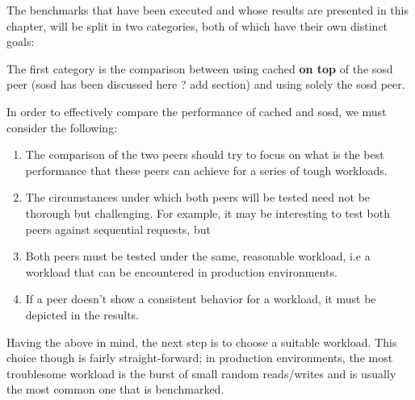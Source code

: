 The benchmarks that have been executed and whose results are presented in this 
chapter, will be split in two categories, both of which have their own distinct 
goals:

The first category is the comparison between using cached \textbf{on top} of 
the sosd peer (sosd has been discussed here ? \fixme add section) and using 
solely the sosd peer.

\begin{comment}
The category's goal is to "defend" one of the core thesis arguments, that 
tiering is a key element that will improve the performance of Archipelago.  
\end{comment}

In order to effectively compare the performance of cached and sosd, we must 
consider the following: 

\begin{enumerate}
	\item The comparison of the two peers should try to focus on what is 
		the best performance that these peers can achieve for a series 
		of tough workloads.
	\item The circumstances under which both peers will be tested need not 
		be thorough but challenging. For example, it may be interesting 
		to test both peers against sequential requests, but
	\item Both peers must be tested under the same, reasonable workload, i.e a 
		workload that can be encountered in production environments.
	\item If a peer doesn't show a consistent behavior for a workload, it must 
		be depicted in the results.
\end{enumerate}

Having the above in mind, the next step is to choose a suitable workload.  This 
choice though is fairly straight-forward; in production environments, the most 
troublesome workload is the burst of small random reads/writes and is usually 
the most common one that is benchmarked.  

